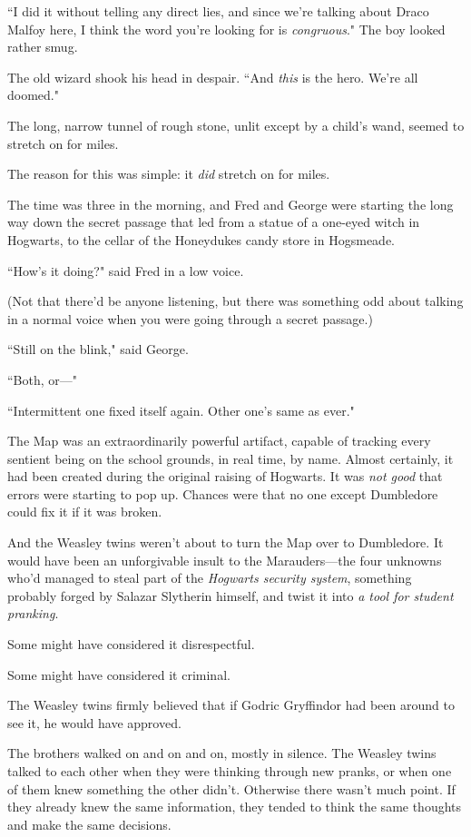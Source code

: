 ``I did it without telling any direct lies, and since we're talking about Draco Malfoy here, I think the word you're looking for is \emph{congruous}." The boy looked rather smug.

The old wizard shook his head in despair. ``And \emph{this} is the hero. We're all doomed."


The long, narrow tunnel of rough stone, unlit except by a child's wand, seemed to stretch on for miles.

The reason for this was simple: it \emph{did} stretch on for miles.

The time was three in the morning, and Fred and George were starting the long way down the secret passage that led from a statue of a one-eyed witch in Hogwarts, to the cellar of the Honeydukes candy store in Hogsmeade.

``How's it doing?" said Fred in a low voice.

(Not that there'd be anyone listening, but there was something odd about talking in a normal voice when you were going through a secret passage.)

``Still on the blink," said George.

``Both, or—"

``Intermittent one fixed itself again. Other one's same as ever."

The Map was an extraordinarily powerful artifact, capable of tracking every sentient being on the school grounds, in real time, by name. Almost certainly, it had been created during the original raising of Hogwarts. It was \emph{not good} that errors were starting to pop up. Chances were that no one except Dumbledore could fix it if it was broken.

And the Weasley twins weren't about to turn the Map over to Dumbledore. It would have been an unforgivable insult to the Marauders—the four unknowns who'd managed to steal part of the \emph{Hogwarts security system}, something probably forged by Salazar Slytherin himself, and twist it into \emph{a tool for student pranking}.

Some might have considered it disrespectful.

Some might have considered it criminal.

The Weasley twins firmly believed that if Godric Gryffindor had been around to see it, he would have approved.

The brothers walked on and on and on, mostly in silence. The Weasley twins talked to each other when they were thinking through new pranks, or when one of them knew something the other didn't. Otherwise there wasn't much point. If they already knew the same information, they tended to think the same thoughts and make the same decisions.


